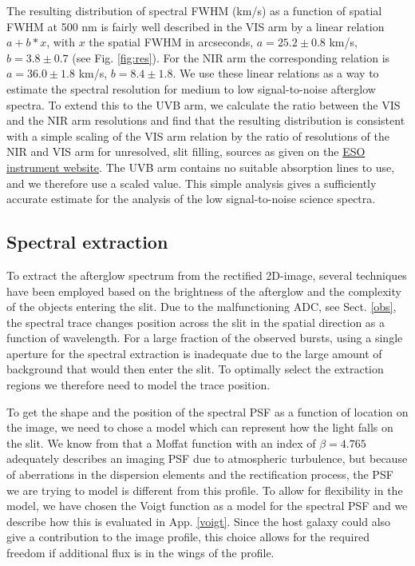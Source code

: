 \documentclass{aa}    %
\begin{document}
The resulting distribution of spectral FWHM (km/s) as a function of spatial
FWHM at 500 nm is fairly well described in the VIS arm by a linear relation $a
+ b*x$, with $x$ the spatial FWHM in arcseconds, $a= 25.2 \pm 0.8$ km/s, $b=3.8
\pm 0.7$ (see Fig. \ref{fig:res}). For the NIR arm the corresponding relation
is $a= 36.0 \pm 1.8$ km/s, $b=8.4 \pm 1.8$. We use these linear relations as a
way to estimate the spectral resolution for medium to low signal-to-noise
afterglow spectra. To extend this to the UVB arm, we calculate the ratio
between the VIS and the NIR arm resolutions and find that the resulting
distribution is consistent with a simple scaling of the VIS arm relation by the
ratio of resolutions of the NIR and VIS arm for unresolved, slit filling,
sources as given on the
\href{https://www.eso.org/sci/facilities/paranal/instruments/xshooter/inst.html}{ESO instrument website}. The UVB arm contains no suitable absorption lines to use, and we therefore use a scaled value. This simple analysis gives a sufficiently accurate estimate for the analysis of the low signal-to-noise science spectra.



\subsection{Spectral extraction}    \label{extract}

To extract the afterglow spectrum from the rectified 2D-image, several
techniques have been employed based on the brightness of the afterglow and the
complexity of the objects entering the slit. Due to the malfunctioning ADC, see
Sect. \ref{obs}, the spectral trace changes position across the slit in the
spatial direction as a function of wavelength. For a large fraction of the
observed bursts, using a single aperture for the spectral extraction is
inadequate due to the large amount of background that would then enter the slit.
To optimally select the extraction regions we therefore need to model the trace
position.

To get the shape and the position of the spectral PSF as a function of location
on the image, we need to chose a model which can represent how the light falls
on the slit. We know from \citet{Trujillo2001} that a Moffat function
\citep{Moffat1969} with an index of $\beta = 4.765$ adequately describes an
imaging PSF due to atmospheric turbulence, but because of aberrations in the
dispersion elements and the rectification process, the PSF we are trying to
model is different from this profile. To allow for flexibility in the model, we
have chosen the Voigt function as a model for the spectral PSF and we describe
how this is evaluated in App. \ref{voigt}. Since the host galaxy could also give
a contribution to the image profile, this choice allows for the required freedom
if additional flux is in the wings of the profile.
\end{document}
